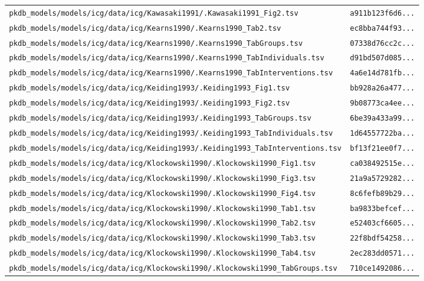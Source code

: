 \begin{longtable}{ll}
\texttt{pkdb\_models/models/icg/data/icg/Kawasaki1991/.Kawasaki1991\_Fig2.tsv} & \texttt{a911b123f6d6...} \\
\texttt{pkdb\_models/models/icg/data/icg/Kearns1990/.Kearns1990\_Tab2.tsv} & \texttt{ec8bba744f93...} \\
\texttt{pkdb\_models/models/icg/data/icg/Kearns1990/.Kearns1990\_TabGroups.tsv} & \texttt{07338d76cc2c...} \\
\texttt{pkdb\_models/models/icg/data/icg/Kearns1990/.Kearns1990\_TabIndividuals.tsv} & \texttt{d91bd507d085...} \\
\texttt{pkdb\_models/models/icg/data/icg/Kearns1990/.Kearns1990\_TabInterventions.tsv} & \texttt{4a6e14d781fb...} \\
\texttt{pkdb\_models/models/icg/data/icg/Keiding1993/.Keiding1993\_Fig1.tsv} & \texttt{bb928a26a477...} \\
\texttt{pkdb\_models/models/icg/data/icg/Keiding1993/.Keiding1993\_Fig2.tsv} & \texttt{9b08773ca4ee...} \\
\texttt{pkdb\_models/models/icg/data/icg/Keiding1993/.Keiding1993\_TabGroups.tsv} & \texttt{6be39a433a99...} \\
\texttt{pkdb\_models/models/icg/data/icg/Keiding1993/.Keiding1993\_TabIndividuals.tsv} & \texttt{1d64557722ba...} \\
\texttt{pkdb\_models/models/icg/data/icg/Keiding1993/.Keiding1993\_TabInterventions.tsv} & \texttt{bf13f21ee0f7...} \\
\texttt{pkdb\_models/models/icg/data/icg/Klockowski1990/.Klockowski1990\_Fig1.tsv} & \texttt{ca038492515e...} \\
\texttt{pkdb\_models/models/icg/data/icg/Klockowski1990/.Klockowski1990\_Fig3.tsv} & \texttt{21a9a5729282...} \\
\texttt{pkdb\_models/models/icg/data/icg/Klockowski1990/.Klockowski1990\_Fig4.tsv} & \texttt{8c6fefb89b29...} \\
\texttt{pkdb\_models/models/icg/data/icg/Klockowski1990/.Klockowski1990\_Tab1.tsv} & \texttt{ba9833befcef...} \\
\texttt{pkdb\_models/models/icg/data/icg/Klockowski1990/.Klockowski1990\_Tab2.tsv} & \texttt{e52403cf6605...} \\
\texttt{pkdb\_models/models/icg/data/icg/Klockowski1990/.Klockowski1990\_Tab3.tsv} & \texttt{22f8bdf54258...} \\
\texttt{pkdb\_models/models/icg/data/icg/Klockowski1990/.Klockowski1990\_Tab4.tsv} & \texttt{2ec283dd0571...} \\
\texttt{pkdb\_models/models/icg/data/icg/Klockowski1990/.Klockowski1990\_TabGroups.tsv} & \texttt{710ce1492086...} \\

\end{longtable}
